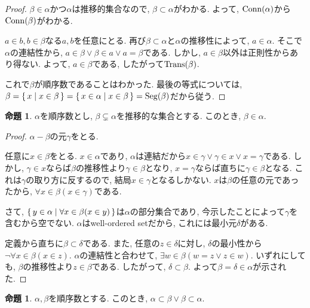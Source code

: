 \documentclass[a4paper, twoside]{bxjsarticle}
\theoremstyle{definition}
\newtheorem{prop}[thm]{命題}
\begin{document}
        \begin{proof}
            $\beta \in \alpha$かつ$\alpha$は推移的集合なので, $\beta \subset \alpha$がわかる. よって, ${\rm Conn}(\alpha)$から${\rm Conn}(\beta)$がわかる.
            
            $a\in b, b \in \beta$なる$a, b$を任意にとる. 再び$\beta \subset \alpha$と$\alpha$の推移性によって, $a\in \alpha$. そこで$\alpha$の連結性から, $a\in \beta \lor \beta\in a \lor a=\beta$である. しかし, $a\in \beta$以外は正則性からあり得ない. よって, $a\in \beta$である, したがって${\rm Trans}(\beta)$. 
            
            これで$\beta$が順序数であることはわかった. 最後の等式については, $\beta=\set{x|x\in \beta}=\set{x\in\alpha|x\in\beta} = {\rm Seg}(\beta)$だから従う.
        \end{proof}
        \begin{prop}
            $\alpha$を順序数とし, $\beta\subsetneq\alpha$を推移的な集合とする. このとき, $\beta\in\alpha$.
        \end{prop}
        \begin{proof}
            $\alpha-\beta$の元$\gamma$をとる. 
            
            任意に$x\in\beta$をとる. $x\in\alpha$であり, $\alpha$は連結だから$x\in\gamma \lor \gamma\in x\lor x=\gamma$である. しかし, $\gamma\in x$ならば$\beta$の推移性より$\gamma\in\beta$となり, $x=\gamma$ならば直ちに$\gamma\in\beta$となる. これは$\gamma$の取り方に反するので, 結局$x\in\gamma$となるしかない. $x$は$\beta$の任意の元であったから, $\forall x\in\beta(x\in\gamma)$である. 
            
            さて, $\set{y\in\alpha|\forall x\in\beta(x\in y)}$は$\alpha$の部分集合であり, 今示したことによって$\gamma$を含むから空でない. $\alpha$はwell-ordered setだから, これには最小元$\delta$がある.
            
            定義から直ちに$\beta\subset\delta$である. また, 任意の$z\in\delta$に対し, $\delta$の最小性から$\lnot\forall x\in\beta(x\in z)$. $\alpha$の連結性と合わせて, $\exists w\in\beta(w=z\lor z\in w)$. いずれにしても, $\beta$の推移性より$z\in\beta$である. したがって, $\delta\subset\beta$. よって$\beta=\delta\in\alpha$が示された.
        \end{proof}
        \begin{prop}
            $\alpha, \beta$を順序数とする. このとき, $\alpha\subset\beta \lor \beta\subset\alpha$.
        \end{prop}
\end{document}
